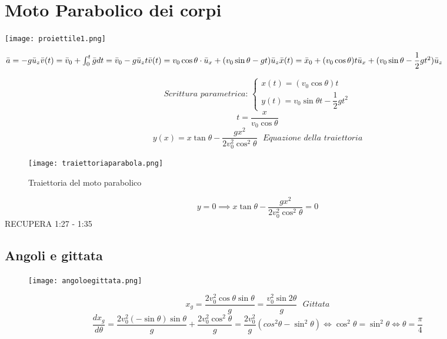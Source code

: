 \documentclass[../../main.tex]{subfiles}
\begin{document}
\section{Moto Parabolico dei corpi}

\begin{minipage}{0.6\textwidth}
    \texttt{[image: proiettile1.png]}
\end{minipage}
\begin{minipage}{0.4\textwidth}
    \begin{math}
        \bar{a} = -g\bar{u}_z \\
        \bar{v}(t) = \bar v_0 + \int_{0}^{t} \bar{g}dt = \bar{v}_0 - g\bar{u}_z t \\
        \bar v (t) = v_0\cos\theta \cdot \bar u_x + (v_0\sin\theta - gt)\bar u_z \\
        \bar x(t) = \bar x_0 + (v_0\cos\theta)t\bar u_x + (v_0\sin\theta - \dfrac{1}{2}gt^2)\bar u_z
    \end{math}
\end{minipage}

\[
    \textit{Scrittura parametrica: }
    \begin{cases}
        x(t) = (v_0\cos\theta)t \\
        y(t) = v_0\sin\theta t - \dfrac{1}{2}gt^2
    \end{cases}
\]
\[
    t = \dfrac{x}{v_0\cos\theta}
\]
\[
    y(x) = x\tan\theta - \dfrac{gx^2}{2v_0^2\cos^2\theta} \ \ \ \textit{Equazione della traiettoria}
\]
\begin{figure}[h!]
    \centering
    \texttt{[image: traiettoriaparabola.png]}
    \caption{Traiettoria del moto parabolico}
\end{figure}
\[
    y = 0 \implies x\tan\theta - \dfrac{gx^2}{2v_0^2\cos^2\theta} = 0
\]
RECUPERA 1:27 - 1:35

\subsection{Angoli e gittata}
\begin{figure}[h!]
    \centering
    \texttt{[image: angoloegittata.png]}
\end{figure}
\[
    x_g = \dfrac{2v_0^2\cos\theta\sin\theta}{g} = \dfrac{v_0^2\sin 2\theta}{g} \ \ \ \textit{Gittata}
\]
\[
    \dfrac{dx_g}{d\theta} = \dfrac{2v_0^2(-\sin\theta)\sin\theta}{g} + \dfrac{2v_0^2\cos^2\theta}{g} = \dfrac{2v_0^2}{g}(cos^2\theta - \sin^2\theta) \iff \cos^2\theta = \sin^2\theta \iff \theta = \frac{\pi}{4}
\]
\end{document}
